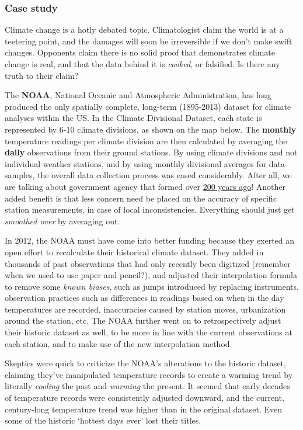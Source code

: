 \documentclass[11pt]{article}
\begin{document}
\hypertarget{case-study}{%
\subsubsection{Case study}\label{case-study}}

Climate change is a hotly debated topic. Climatologist claim the world
is at a teetering point, and the damages will soon be irreversible if we
don't make swift changes. Opponents claim there is no solid proof that
demonstrates climate change is real, and that the data behind it is
\emph{cooked}, or falsified. Is there any truth to their claim?

The \textbf{NOAA}, National Oceanic and Atmospheric Administration, has
long produced the only spatially complete, long-term (1895-2013) dataset
for climate analyses within the US. In the Climate Divisional Dataset,
each state is represented by 6-10 climate divisions, as shown on the map
below. The \textbf{monthly} temperature readings per climate division
are then calculated by averaging the \textbf{daily} observations from
their ground stations. By using climate divisions and not individual
weather stations, and by using monthly divisional averages for
data-samples, the overall data collection process was eased
considerably. After all, we are talking about government agency that
formed over \href{http://celebrating200years.noaa.gov/}{200 years ago}!
Another added benefit is that less concern need be placed on the
accuracy of specific station measurements, in case of local
inconsistencies. Everything should just get \emph{smoothed over} by
averaging out.

In 2012, the NOAA must have come into better funding because they
exerted an open effort to recalculate their historical climate dataset.
They added in thousands of past observations that had only recently been
digitized (remember when we used to use paper and pencil?), and adjusted
their interpolation formula to remove some \emph{known biases}, such as
jumps introduced by replacing instruments, observation practices such as
differences in readings based on when in the day temperatures are
recorded, inaccuracies caused by station moves, urbanization around the
station, etc. The NOAA further went on to retrospectively adjust their
historic dataset as well, to be more in line with the current
observations at each station, and to make use of the new interpolation
method.

Skeptics were quick to criticize the NOAA's alterations to the historic
dataset, claiming they've manipulated temperature records to create a
warming trend by literally \emph{cooling} the past and \emph{warming}
the present. It seemed that early decades of temperature records were
consistently adjusted downward, and the current, century-long
temperature trend was higher than in the original dataset. Even some of
the historic `hottest days ever' lost their titles.
\end{document}
